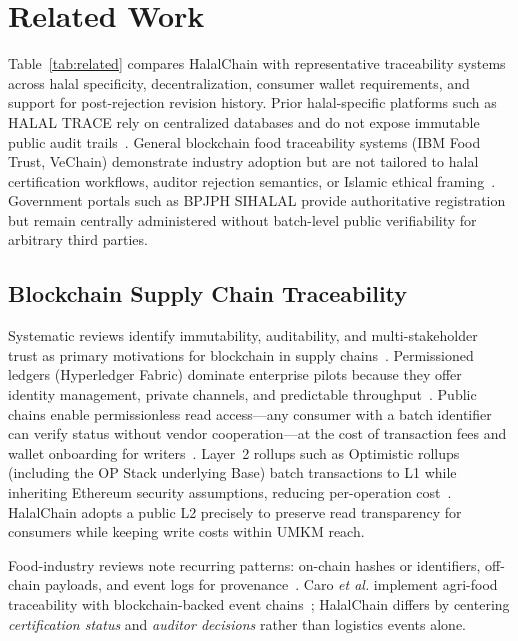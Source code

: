 \section{Related Work}
\label{sec:related}

Table~\ref{tab:related} compares HalalChain with representative traceability systems across halal specificity, decentralization, consumer wallet requirements, and support for post-rejection revision history.
Prior halal-specific platforms such as HALAL TRACE rely on centralized databases and do not expose immutable public audit trails~\cite{rashid2018halal}.
General blockchain food traceability systems (IBM Food Trust, VeChain) demonstrate industry adoption but are not tailored to halal certification workflows, auditor rejection semantics, or Islamic ethical framing~\cite{kamilaris2019blockchain,casino2021systematic,kamath2018blockchain}.
Government portals such as BPJPH SIHALAL provide authoritative registration but remain centrally administered without batch-level public verifiability for arbitrary third parties.



\subsection{Blockchain Supply Chain Traceability}
Systematic reviews identify immutability, auditability, and multi-stakeholder trust as primary motivations for blockchain in supply chains~\cite{casino2021systematic,kshetri2018blockchain,galvez2018future}.
Permissioned ledgers (Hyperledger Fabric) dominate enterprise pilots because they offer identity management, private channels, and predictable throughput~\cite{andoni2019blockchain,abeyratne2016blockchain}.
Public chains enable permissionless read access---any consumer with a batch identifier can verify status without vendor cooperation---at the cost of transaction fees and wallet onboarding for writers~\cite{underwood2016blockchain}.
Layer~2 rollups such as Optimistic rollups (including the OP Stack underlying Base) batch transactions to L1 while inheriting Ethereum security assumptions, reducing per-operation cost~\cite{kalodner2018arbitrum,optimism2024spec}.
HalalChain adopts a public L2 precisely to preserve read transparency for consumers while keeping write costs within UMKM reach.

Food-industry reviews note recurring patterns: on-chain hashes or identifiers, off-chain payloads, and event logs for provenance~\cite{rejeb2020blockchain,kouhizadeh2018blockchain}.
Caro \emph{et al.} implement agri-food traceability with blockchain-backed event chains~\cite{caro2018blockchain}; HalalChain differs by centering \emph{certification status} and \emph{auditor decisions} rather than logistics events alone.

